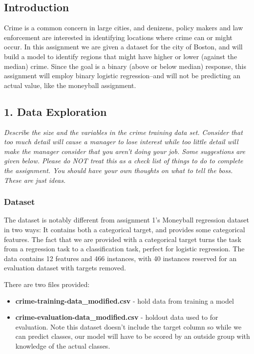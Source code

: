 \documentclass[
]{article}
\providecommand{\tightlist}{%
  \setlength{\itemsep}{0pt}\setlength{\parskip}{0pt}}
\begin{document}
\hypertarget{introduction}{%
\subsection{Introduction}\label{introduction}}

Crime is a common concern in large cities, and denizens, policy makers
and law enforcement are interested in identifying locations where crime
can or might occur. In this assignment we are given a dataset for the
city of Boston, and will build a model to identify regions that might
have higher or lower (against the median) crime. Since the goal is a
binary (above or below median) response, this assignment will employ
binary logistic regression--and will not be predicting an actual value,
like the moneyball assignment.

\hypertarget{data-exploration}{%
\subsection{1. Data Exploration}\label{data-exploration}}

\emph{Describe the size and the variables in the crime training data
set. Consider that too much detail will cause a manager to lose interest
while too little detail will make the manager consider that you aren't
doing your job. Some suggestions are given below. Please do NOT treat
this as a check list of things to do to complete the assignment. You
should have your own thoughts on what to tell the boss. These are just
ideas.}

\hypertarget{dataset}{%
\subsubsection{Dataset}\label{dataset}}

The dataset is notably different from assignment 1's Moneyball
regression dataset in two ways: It contains both a categorical target,
and provides some categorical features. The fact that we are provided
with a categorical target turns the task from a regression task to a
classification task, perfect for logistic regression. The data contains
12 features and 466 instances, with 40 instances reserved for an
evaluation dataset with targets removed.

There are two files provided:

\begin{itemize}
\tightlist
\item
  \textbf{crime-training-data\_modified.csv} - hold data from training a
  model
\item
  \textbf{crime-evaluation-data\_modified.csv} - holdout data used to
  for evaluation. Note this dataset doesn't include the target column so
  while we can predict classes, our model will have to be scored by an
  outside group with knowledge of the actual classes.
\end{itemize}
\end{document}

